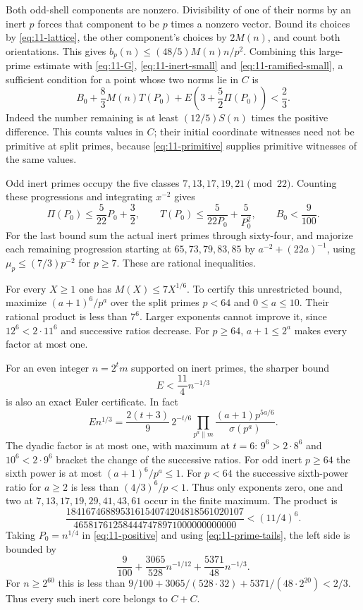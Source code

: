 Both odd-shell components are nonzero.  Divisibility of one of their
norms by an inert $p$ forces that component to be $p$ times a nonzero
vector.  Bound its choices by \eqref{eq:11-lattice}, the other
component's choices by $2M(n)$, and count both orientations.  This gives
$b_p(n)\le(48/5)M(n)n/p^2$.
Combining this large-prime estimate with
\eqref{eq:11-G}, \eqref{eq:11-inert-small} and
\eqref{eq:11-ramified-small}, a sufficient condition for a point
whose two norms lie in $C$ is
\begin{equation}\label{eq:11-positive}
 B_0+\frac83 M(n)T(P_0)
                   +E\left(3+\frac52\Pi(P_0)\right)<\frac23.
\end{equation}
Indeed the number remaining is at least $(12/5)S(n)$ times the
positive difference.  This counts values in $C$; their initial
coordinate witnesses need not be primitive at split primes, because
\eqref{eq:11-primitive} supplies primitive witnesses of the same values.

Odd inert primes occupy the five classes $7,13,17,19,21\pmod{22}$.
Counting these progressions and integrating $x^{-2}$ gives
\begin{equation}\label{eq:11-prime-tails}
 \Pi(P_0)\le\frac5{22}P_0+\frac32,\qquad
 T(P_0)\le\frac5{22P_0}+\frac5{P_0^2},\qquad B_0<\frac9{100}.
\end{equation}
For the last bound sum the actual inert primes through sixty-four,
and majorize each remaining progression starting at
$65,73,79,83,85$ by $a^{-2}+(22a)^{-1}$, using
$\mu_p\le(7/3)p^{-2}$ for $p\ge7$.  These are rational inequalities.

For every $X\ge1$ one has $M(X)\le7X^{1/6}$.
To certify this unrestricted bound, maximize $(a+1)^6/p^a$ over the
split primes $p<64$ and $0\le a\le10$.  Their rational product is
less than $7^6$.  Larger exponents cannot improve it, since
$12^6<2\cdot11^6$ and successive ratios decrease.  For $p\ge64$,
$a+1\le2^a$ makes every factor at most one.

For an even integer $n=2^t m$ supported on inert primes, the sharper
bound
\begin{equation}\label{eq:11-sharp-E}
                         E<\frac{11}{4}n^{-1/3}
\end{equation}
is also an exact Euler certificate.  In fact
\[
 E n^{1/3}=\frac{2(t+3)}9\,2^{-t/6}
   \prod_{p^a\parallel m}\frac{(a+1)p^{5a/6}}{\sigma(p^a)}.
\]
The dyadic factor is at most one, with maximum at $t=6$:
$9^6>2\cdot8^6$ and $10^6<2\cdot9^6$ bracket the change of the
successive ratios.  For odd inert $p\ge64$ the sixth power is at
most $(a+1)^6/p^a\le1$.  For $p<64$ the successive sixth-power
ratio for $a\ge2$ is less than $(4/3)^6/p<1$.  Thus only exponents
zero, one and two at $7,13,17,19,29,41,43,61$ occur in the finite
maximum.  The product is
\[
 \frac{184167468895316154074204818561020107}
      {465817612584447478971000000000000}<(11/4)^6.
\]
Taking $P_0=n^{1/4}$ in \eqref{eq:11-positive} and using
\eqref{eq:11-prime-tails}, the left side is bounded by
\[
 \frac9{100}+\frac{3065}{528}n^{-1/12}
                         +\frac{5371}{48}n^{-1/3}.
\]
For $n\ge2^{60}$ this is less than
$9/100+3065/(528\cdot32)+5371/(48\cdot2^{20})<2/3$.
Thus every such inert core belongs to $C+C$.

